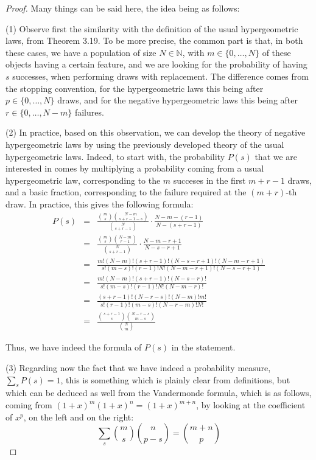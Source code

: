 \documentclass[12pt]{amsbook}
\begin{document}
\begin{proof}
Many things can be said here, the idea being as follows:

\medskip

(1) Observe first the similarity with the definition of the usual hypergeometric laws, from Theorem 3.19. To be more precise, the common part is that, in both these cases, we have a population of size $N\in\mathbb N$, with $m\in\{0,\ldots,N\}$ of these objects having a certain feature, and we are looking for the probability of having $s$ successes, when performing draws with replacement. The difference comes from the stopping convention, for the hypergeometric laws this being after $p\in\{0,\ldots,N\}$ draws, and for the negative hypergeometric laws this being after $r\in\{0,\ldots,N-m\}$ failures.

\medskip

(2) In practice, based on this observation, we can develop the theory of negative hypergeometric laws by using the previously developed theory of the usual hypergeometric laws. Indeed, to start with, the probability $P(s)$ that we are interested in comes by multiplying a probability coming from a usual hypergeometric law, corresponding to the $m$ succeses in the first $m+r-1$ draws, and a basic fraction, corresponding to the failure required at the $(m+r)$-th draw. In practice, this gives the following formula:
\begin{eqnarray*}
P(s)
&=&\frac{\binom{m}{s}\binom{N-m}{s+r-1-s}}{\binom{N}{s+r-1}}\cdot\frac{N-m-(r-1)}{N-(s+r-1)}\\
&=&\frac{\binom{m}{s}\binom{N-m}{r-1}}{\binom{N}{s+r-1}}\cdot\frac{N-m-r+1}{N-s-r+1}\\
&=&\frac{m!(N-m)!(s+r-1)!(N-s-r+1)!(N-m-r+1)}{s!(m-s)!(r-1)!N!(N-m-r+1)!(N-s-r+1)}\\
&=&\frac{m!(N-m)!(s+r-1)!(N-s-r)!}{s!(m-s)!(r-1)!N!(N-m-r)!}\\
&=&\frac{(s+r-1)!(N-r-s)!(N-m)!m!}{s!(r-1)!(m-s)!(N-r-m)!N!}\\
&=&\frac{\binom{s+r-1}{s}\binom{N-r-s}{m-s}}{\binom{N}{m}}
\end{eqnarray*}

Thus, we have indeed the formula of $P(s)$ in the statement.

\medskip

(3) Regarding now the fact that we have indeed a probability measure, $\sum_sP(s)=1$, this is something which is plainly clear from definitions, but which can be deduced as well from the Vandermonde formula, which is as follows, coming from $(1+x)^m(1+x)^n=(1+x)^{m+n}$, by looking at the coefficient of $x^p$, on the left and on the right:
$$\sum_s\binom{m}{s}\binom{n}{p-s}=\binom{m+n}{p}$$


\end{proof}
\end{document}
